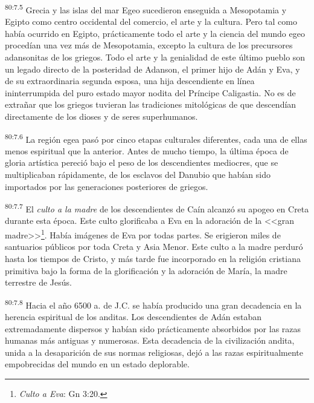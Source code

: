 \par
\textsuperscript{80:7.5} Grecia y las islas del mar Egeo sucedieron enseguida a Mesopotamia y Egipto como centro occidental del comercio, el arte y la cultura. Pero tal como había ocurrido en Egipto, prácticamente todo el arte y la ciencia del mundo egeo procedían una vez más de Mesopotamia, excepto la cultura de los precursores adansonitas de los griegos. Todo el arte y la genialidad de este último pueblo son un legado directo de la posteridad de Adanson, el primer hijo de Adán y Eva, y de su extraordinaria segunda esposa, una hija descendiente en línea ininterrumpida del puro estado mayor nodita del Príncipe Caligastia. No es de extrañar que los griegos tuvieran las tradiciones mitológicas de que descendían directamente de los dioses y de seres superhumanos.

\par
\textsuperscript{80:7.6} La región egea pasó por cinco etapas culturales diferentes, cada una de ellas menos espiritual que la anterior. Antes de mucho tiempo, la última época de gloria artística pereció bajo el peso de los descendientes mediocres, que se multiplicaban rápidamente, de los esclavos del Danubio que habían sido importados por las generaciones posteriores de griegos.

\par
\textsuperscript{80:7.7} El \textit{culto a la madre} de los descendientes de Caín alcanzó su apogeo en Creta durante esta época. Este culto glorificaba a Eva en la adoración de la <<gran madre>>\footnote{\textit{Culto a Eva}: Gn 3:20.}. Había imágenes de Eva por todas partes. Se erigieron miles de santuarios públicos por toda Creta y Asia Menor. Este culto a la madre perduró hasta los tiempos de Cristo, y más tarde fue incorporado en la religión cristiana primitiva bajo la forma de la glorificación y la adoración de María, la madre terrestre de Jesús.

\par
\textsuperscript{80:7.8} Hacia el año 6500 a. de J.C. se había producido una gran decadencia en la herencia espiritual de los anditas. Los descendientes de Adán estaban extremadamente dispersos y habían sido prácticamente absorbidos por las razas humanas más antiguas y numerosas. Esta decadencia de la civilización andita, unida a la desaparición de sus normas religiosas, dejó a las razas espiritualmente empobrecidas del mundo en un estado deplorable.

